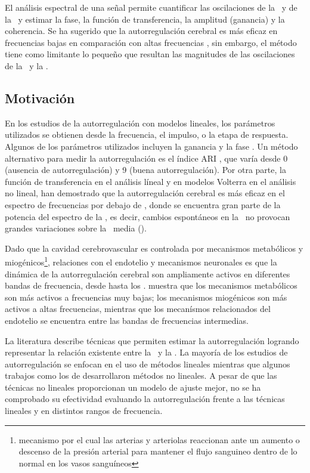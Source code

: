 El análisis espectral de una señal permite cuantificar las oscilaciones de la \bp\, y de la \cbfv\, y estimar la fase, la función de transferencia, la amplitud (ganancia) y la coherencia. Se ha sugerido que la autorregulación cerebral es más eficaz en frecuencias bajas en comparación con altas frecuencias \citep{Diehl1995, Diehl1998, Giller1990, Panerai1998b, Zhang1998}, sin embargo, el método tiene como limitante lo pequeño que resultan las magnitudes de las oscilaciones de la \bp\, y la \cbfv.

\subsection{Motivación}
En los estudios de la autorregulación con modelos lineales, los parámetros utilizados se obtienen desde la frecuencia, el impulso, o la etapa de respuesta. Algunos de los parámetros utilizados incluyen la ganancia y la fase \citep{Zhang1998, Birch1995, Panerai1999, Liu2003}. Un método alternativo para medir la autorregulación es el índice ARI \citep{Tiecks1995a}, que varía desde 0 (ausencia de autorregulación) y 9 (buena autorregulación). Por otra parte, la función de transferencia en el análisis líneal y en modelos Volterra en el análisis no lineal, han demostrado que la autorregulación cerebral es más eficaz en el espectro de frecuencias por debajo de , donde se encuentra gran parte de la potencia del espectro de la \abp, es decir, cambios espontáneos en la \pam\, no provocan grandes variaciones sobre la \cbfv\, media (\mcbfv).

Dado que la cavidad cerebrovascular es controlada por mecanismos metabólicos y miogénicos\footnote{mecanismo por el cual las arterias y arteriolas reaccionan ante un aumento o descenso de la presión arterial para mantener el flujo sanguineo dentro de lo normal en los vasos sanguíneos}, relaciones con el endotelio y mecanismos neuronales \citep{Faraci1998, Panerai1999, Paulson1990} es que la dinámica de la autorregulación cerebral son ampliamente activos en diferentes bandas de frecuencia, desde  hasta los . \cite{Zhang1998} muestra que los mecanismos metabólicos son más activos a frecuencias muy bajas; los mecanismos miogénicos son más activos a altas frecuencias, mientras que los mecanísmos relacionados del endotelio se encuentra entre las bandas de frecuencias intermedias.

La literatura describe técnicas que permiten estimar la autorregulación logrando representar la relación existente entre la \pam\, y la \cbfv. La mayoría de los estudios de autorregulación se enfocan en el uso de métodos lineales \citep{Zhang1998, Birch1995, Panerai1999, Simpson2001, Panerai2004} mientras que algunos trabajos como los de \cite{Panerai1999, Panerai2004, Mitsis2004a, Mitsis2002, Angarita2011} desarrollaron métodos no lineales. A pesar de que las técnicas no lineales proporcionan un modelo de ajuste mejor, no se ha comprobado su efectividad evaluando la autorregulación frente a las técnicas lineales y en distintos rangos de frecuencia.

